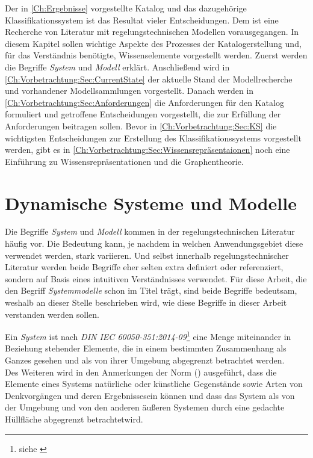 Der in \autoref{Ch:Ergebnisse} vorgestellte Katalog und das dazugehörige Klassifikationssystem ist das Resultat vieler Entscheidungen. Dem ist eine Recherche von Literatur mit regelungstechnischen Modellen vorausgegangen. In diesem Kapitel sollen wichtige Aspekte des Prozesses der Katalogerstellung und, für das Verständnis benötigte, Wissenselemente vorgestellt werden. Zuerst werden die Begriffe \textit{System} und \textit{Modell} erklärt. Anschließend wird in \autoref{Ch:Vorbetrachtung:Sec:CurrentState} der aktuelle Stand der Modellrecherche und vorhandener Modellsammlungen vorgestellt. Danach werden in \autoref{Ch:Vorbetrachtung:Sec:Anforderungen} die Anforderungen für den Katalog formuliert und getroffene Entscheidungen vorgestellt, die zur Erfüllung der Anforderungen beitragen sollen. Bevor in \autoref{Ch:Vorbetrachtung:Sec:KS} die wichtigsten Entscheidungen zur Erstellung des Klassifikationssystems vorgestellt werden, gibt es in \autoref{Ch:Vorbetrachtung:Sec:Wissensrepräsentaionen} noch eine Einführung zu Wissensrepräsentationen und die Graphentheorie.   

\section{Dynamische Systeme und Modelle}
\label{Ch:Vorbetrachtung:Sec:SystemeModelle}
Die Begriffe \textit{System} und \textit{Modell} kommen in der regelungstechnischen Literatur häufig vor. Die Bedeutung kann, je nachdem in welchen Anwendungsgebiet diese verwendet werden, stark variieren. Und selbst innerhalb regelungstechnischer Literatur werden beide Begriffe eher selten extra definiert oder referenziert, sondern auf Basis eines intuitiven Verständnisses verwendet. Für diese Arbeit, die den Begriff \textit{Systemmodelle} schon im Titel trägt, sind beide Begriffe bedeutsam, weshalb an dieser Stelle beschrieben wird, wie diese Begriffe in dieser Arbeit verstanden werden sollen.

Ein \textit{System} ist nach \textit{DIN IEC 60050-351:2014-09}\footnote{siehe \cite[S. 21]{DINIEC60050-351} } eine \glqq Menge miteinander in Beziehung stehender Elemente, die in einem bestimmten Zusammenhang als Ganzes gesehen und als von ihrer Umgebung abgegrenzt betrachtet werden\grqq.\\
Des Weiteren wird in den Anmerkungen der Norm (\cite[S. 21]{DINIEC60050-351}) ausgeführt, dass die Elemente eines Systems \glqq natürliche oder künstliche Gegenstände sowie Arten von Denkvorgängen und deren Ergebnisse\grqq sein können und dass das System \glqq als von der Umgebung und von den anderen äußeren Systemen durch eine gedachte Hüllfläche abgegrenzt betrachtet\grqq wird.


